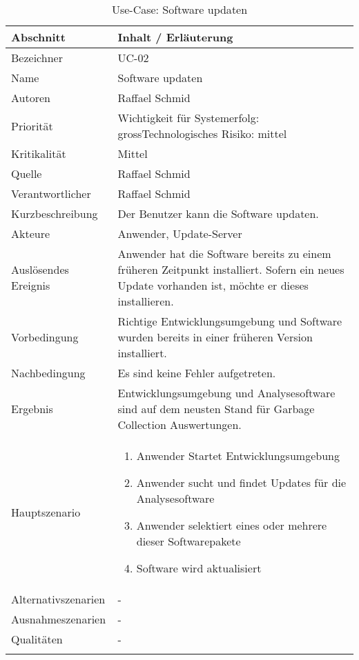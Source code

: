 \begin{longtable}{|p{4cm}|p{10.5cm}|}
\hline
   \textbf{Abschnitt} & \textbf{Inhalt / Erläuterung} \\\hline
   Bezeichner & UC-02\\\hline
   Name & Software updaten\\\hline
   Autoren & Raffael Schmid\\\hline
   Priorität & Wichtigkeit für Systemerfolg: gross\newline Technologisches Risiko: mittel\\\hline
   Kritikalität & Mittel\\\hline
   Quelle & Raffael Schmid\\\hline
   Verantwortlicher & Raffael Schmid\\\hline
   Kurzbeschreibung & Der Benutzer kann die Software updaten.\\\hline
   Akteure & Anwender, Update-Server\\\hline   
   Auslösendes Ereignis & Anwender hat die Software bereits zu einem früheren Zeitpunkt installiert. Sofern ein neues Update vorhanden ist, möchte er dieses installieren.\\\hline
   Vorbedingung & Richtige Entwicklungsumgebung und Software wurden bereits in einer früheren Version installiert.\\\hline
   Nachbedingung & Es sind keine Fehler aufgetreten.\\\hline
   Ergebnis & Entwicklungsumgebung und Analysesoftware sind auf dem neusten Stand für Garbage Collection Auswertungen.\\\hline
   Hauptszenario & 
	\begin{enumerate}
		\item Anwender Startet Entwicklungsumgebung
		\item Anwender sucht und findet Updates für die Analysesoftware
		\item Anwender selektiert eines oder mehrere dieser Softwarepakete
		\item Software wird aktualisiert
	\end{enumerate}
	\\\hline
   Alternativszenarien & -\\\hline
   Ausnahmeszenarien & -\\\hline
   Qualitäten & -\\\hline
\caption{Use-Case: Software updaten}
\end{longtable}

